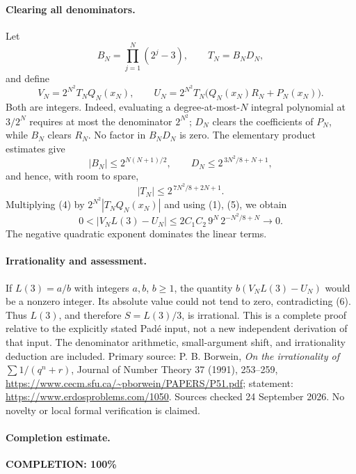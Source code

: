 \paragraph{Clearing all denominators.}
Let
\[
 B_N=\prod_{j=1}^{N}(2^j-3),\qquad T_N=B_ND_N,
\]
and define
\[
 V_N=2^{N^2}T_NQ_N(x_N),\qquad
 U_N=2^{N^2}T_N\bigl(Q_N(x_N)R_N+P_N(x_N)\bigr).
\]
Both are integers. Indeed, evaluating a degree-at-most-\(N\) integral polynomial at \(3/2^N\) requires at most the denominator \(2^{N^2}\); \(D_N\) clears the coefficients of \(P_N\), while \(B_N\) clears \(R_N\). No factor in \(B_ND_N\) is zero.
The elementary product estimates give
\[
 |B_N|\leq2^{N(N+1)/2},\qquad
 D_N\leq2^{\,3N^2/8+N+1},
\]
and hence, with room to spare,
\[
 |T_N|\leq2^{\,7N^2/8+2N+1}.
 \tag{5}
\]
Multiplying (4) by \(2^{N^2}|T_NQ_N(x_N)|\) and using (1), (5), we obtain
\[
 0<|V_NL(3)-U_N|
 \leq 2C_1C_2\,9^N\,2^{-N^2/8+N}
 \longrightarrow0.
 \tag{6}
\]
The negative quadratic exponent dominates the linear terms.

\paragraph{Irrationality and assessment.}
If \(L(3)=a/b\) with integers \(a,b\), \(b\geq1\), the quantity
\(b(V_NL(3)-U_N)\) would be a nonzero integer. Its absolute value could not tend to zero, contradicting (6). Thus \(L(3)\), and therefore \(S=L(3)/3\), is irrational.
This is a complete proof relative to the explicitly stated Pad\'e input, not a new independent derivation of that input. The denominator arithmetic, small-argument shift, and irrationality deduction are included. Primary source: P. B. Borwein, \emph{On the irrationality of \(\sum 1/(q^n+r)\)}, Journal of Number Theory 37 (1991), 253--259, \url{https://www.cecm.sfu.ca/~pborwein/PAPERS/P51.pdf}; statement: \url{https://www.erdosproblems.com/1050}. Sources checked 24 September 2026. No novelty or local formal verification is claimed.

\paragraph{Completion estimate.}
\textbf{COMPLETION: 100\%}
